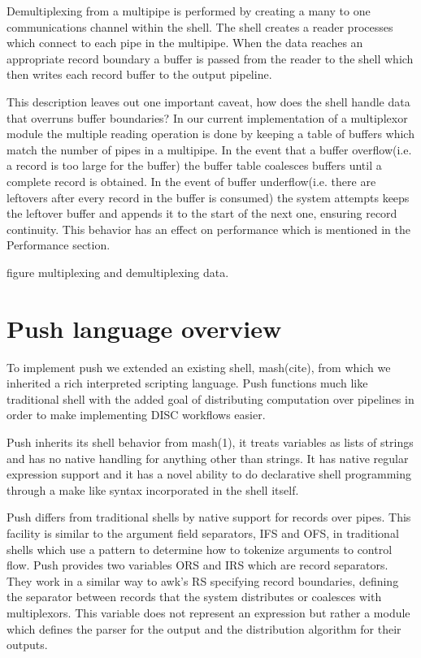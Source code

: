 \documentclass[11pt, letterpaper]{article}
\begin{document}
{Demultiplexing from a multipipe is performed by creating a many to one communications channel within the shell. The shell creates a reader processes which connect to each pipe in the multipipe. When the data reaches an appropriate record boundary a buffer is passed from the reader to the shell which then writes each record buffer to the output pipeline. 

This description leaves out one important caveat, how does the shell handle data that overruns buffer boundaries? In our current implementation of a multiplexor module the multiple reading operation is done by keeping a table of buffers which match the number of pipes in a multipipe. In the event that a buffer overflow(i.e. a record is too large for the buffer) the buffer table coalesces buffers until a complete record is obtained. In the event of buffer underflow(i.e. there are leftovers after every record in the buffer is consumed) the system attempts keeps the leftover buffer and appends it to the start of the next one, ensuring record continuity. This behavior has an effect on performance which is mentioned in the Performance section. 

figure{
multiplexing and demultiplexing data. 
}

  

\section{Push language overview}

        

To implement push we extended an existing shell, mash(cite), from which we inherited a rich interpreted scripting language. Push functions much like traditional shell with the added goal of distributing computation over pipelines in order to make implementing DISC workflows easier.   

Push inherits its shell behavior from mash(1), it treats variables as lists of strings and has no native handling for anything other than strings. It has native regular expression support and it has a novel ability to do declarative shell programming through a make like syntax incorporated in the shell itself.

Push differs from traditional shells by native support for records over pipes. This facility is similar to the argument field separators, IFS and OFS, in traditional shells which use a pattern to determine how to tokenize arguments to control flow.   Push provides two variables ORS and IRS which are record separators. They work in a similar way to awk's RS specifying record boundaries, defining the separator between records that the system distributes or coalesces with multiplexors. This variable does not represent an expression but rather a module which defines the parser for the output and the distribution algorithm for their outputs. 

}
\end{document}
